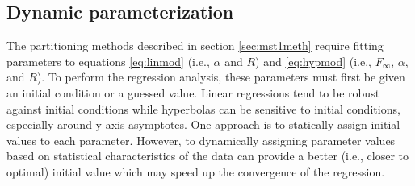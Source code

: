 \subsection{Dynamic parameterization}
\label{sec:mst1dyn}
The partitioning methods described in section \ref{sec:mst1meth} require fitting parameters to equations \ref{eq:linmod} (i.e., $\alpha$ and $R$) and \ref{eq:hypmod} (i.e., $F_{\infty}$, $\alpha$, and $R$). 
To perform the regression analysis, these parameters must first be given an initial condition or a guessed value.  
Linear regressions tend to be robust against initial conditions while hyperbolas can be sensitive to initial conditions, especially around y-axis asymptotes.  
One approach is to statically assign initial values to each parameter.  
However, to dynamically assigning parameter values based on statistical characteristics of the data can provide a better (i.e., closer to optimal) initial value which may speed up the convergence of the regression. 

